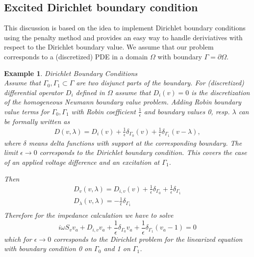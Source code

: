 \documentclass[12pt]{amsproc}
\newtheorem{example}{Example}
\begin{document}
\subsection{Excited Dirichlet boundary condition}
This discussion is based on the idea to implement Dirichlet boundary conditions using the
penalty method and provides an easy way to handle deriviatives with respect to
the Dirichlet boundary value. We assume that our problem corresponds to a (discretized) PDE
in a domain $\Omega$ with boundary $\Gamma=\partial\Omega$.
\begin{example}{Dirichlet Boundary Conditions}\\
  Assume that $\Gamma_0,\Gamma_1\subset \Gamma$  are two disjunct parts of
  the boundary.
  For (discretized) differential operator $D_i$ defined
  in $\Omega$ assume that $D_i(v)=0$ is the discretization of the
  homogeneous Neumann boundary value problem. Adding Robin boundary value terms
  for $\Gamma_0, \Gamma_1$ with Robin coefficient $\frac1\epsilon$ and boundary values
  0, resp. $\lambda$ can be formally
  written as
  \begin{align*}
  D(v,\lambda)= D_i(v)
  +\frac1\epsilon\delta_{\Gamma_0}(v)
  +\frac1\epsilon\delta_{\Gamma_1}(v-\lambda),    
  \end{align*}
  where $\delta$ means delta functions with support at the corresponding boundary.
  The limit $\epsilon\to 0$  corresponds to the Dirichlet boundary condition.
  This covers the case of an
  applied voltage difference  and an excitation at $\Gamma_1$.
  

  Then  
\begin{equation*}
  \begin{split}
    D_v(v,\lambda)= D_{i,v}(v)+ \frac1\epsilon\delta_{\Gamma_0}+ \frac1\epsilon\delta_{\Gamma_1}\\
    D_\lambda(v,\lambda)= -\frac1\epsilon\delta_{\Gamma_1}\\
   \end{split}
\end{equation*}
Therefore  for the impedance calculation we have to solve 
\begin{equation*}
  i\omega S_v v_a + D_{i,v} v_a +\frac1\epsilon\delta_{\Gamma_0}v_a +\frac1\epsilon\delta_{\Gamma_1}(v_a-1) =0
\end{equation*}
which for $\epsilon\to 0$ corresponds to the Dirichlet problem  for the linearized equation 
with boundary condition 0 on $\Gamma_0$ and 1 on $\Gamma_1$.
\end{example}
\end{document}
